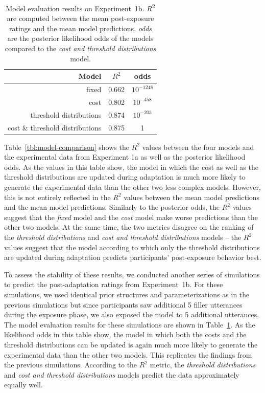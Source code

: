 \documentclass[lucida,biblatex]{sp} %
\begin{document}
\begin{table}
\center
\begin{tabular}{r | c | c }
Model & $R^2$ &   odds  \\ \midrule
fixed & 0.662 & $10^{-1248}$    \\
cost & 0.802 &  $10^{-458}$  \\
threshold distributions & 0.874 & $10^{-203}$  \\
cost \& threshold distributions & 0.875 & 1 \\
\end{tabular}
\caption{Model evaluation results on Experiment~1b.  $R$\textsuperscript{$2$} are computed between  the mean post-exposure ratings and the mean model predictions. \textit{odds} are the posterior likelihood odds of the models compared to the \textit{cost and threshold distributions} model.  \label{tbl:model-comparison-replication}}
\end{table}

Table~\ref{tbl:model-comparison} shows the $R^2$ values between the four models and the experimental data from Experiment 1a 
as well as the posterior likelihood odds. As the values in this table show, the model in which the cost as well as the threshold 
 distributions are updated during adaptation is much more likely to generate the experimental data than the other 
 two less complex models. However, this is not entirely reflected in the $R^2$ values between the mean model predictions
 and the mean model predictions. Similarly to the posterior odds, the $R^2$ values suggest that the \textit{fixed} model
 and the \textit{cost} model make worse predictions than the other two models. At the same time, the two metrics disagree on the 
 ranking of the \textit{threshold distributions} and \textit{cost and threshold distributions} models -- the $R^2$ values suggest
 that the model according to which only the threshold distributions are updated during adaptation predicts 
 participants' post-exposure behavior best.
 
 To assess the stability of these results, we conducted another series of simulations to predict the post-adaptation
 ratings from Experiment~1b. For these simulations, we used identical prior structures and parameterizations as in
 the previous simulations but since participants saw additional 5 filler utterances during the exposure phase,
 we also exposed the model to 5 additional utterances. The model 
evaluation results for these simulations are shown in Table~\ref{tbl:model-comparison-replication}. As the likelihood odds
in this table show, the model in which both the costs and the threshold distributions can be updated is again much more
likely to generate the experimental data than the other two models. This replicates the findings from the previous simulations.
According to the $R^2$ metric, the \textit{threshold distributions} and \textit{cost and threshold distributions} models predict
the data approximately equally well.
\end{document}
